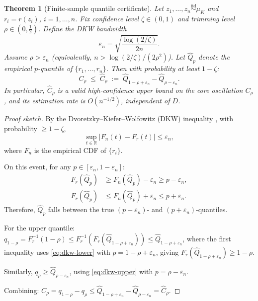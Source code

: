 \documentclass[11pt]{article}
\newtheorem{theorem}{Theorem}
\newcommand{\R}{\mathbb{R}}
\begin{document}
\begin{theorem}[Finite-sample quantile certificate]\label{thm:quantile}
Let $z_1, \dots, z_n \overset{\mathrm{iid}}{\sim} \mu_K$ and $r_i = r(z_i)$, $i=1,\dots,n$. Fix confidence level $\zeta \in (0,1)$ and trimming level $\rho \in (0, \tfrac{1}{2})$. Define the DKW bandwidth
\begin{equation}\label{eq:dkw-eps}
  \varepsilon_n = \sqrt{\frac{\log(2/\zeta)}{2n}}.
\end{equation}
Assume $\rho > \varepsilon_n$ (equivalently, $n > \log(2/\zeta)/(2\rho^2)$). Let $\hat{Q}_p$ denote the empirical $p$-quantile of $\{r_1,\dots,r_n\}$. Then with probability at least $1-\zeta$:
\begin{equation}\label{eq:cert-bound}
  C_\rho \;\le\; \hat{C}_\rho \;:=\; \hat{Q}_{1-\rho+\varepsilon_n} - \hat{Q}_{\rho-\varepsilon_n}.
\end{equation}
In particular, $\hat{C}_\rho$ is a valid high-confidence upper bound on the core oscillation $C_\rho$, and its estimation rate is $O(n^{-1/2})$, independent of $D$.
\end{theorem}

\begin{proof}[Proof sketch]
By the Dvoretzky--Kiefer--Wolfowitz (DKW) inequality \cite{DKW1956,Massart1990}, with probability $\ge 1-\zeta$,
\[
  \sup_{t \in \R} |F_n(t) - F_r(t)| \le \varepsilon_n,
\]
where $F_n$ is the empirical CDF of $\{r_i\}$.

On this event, for any $p \in [\varepsilon_n, 1-\varepsilon_n]$:
\begin{align}
  F_r(\hat{Q}_p) &\ge F_n(\hat{Q}_p) - \varepsilon_n \ge p - \varepsilon_n, \label{eq:dkw-lower}\\
  F_r(\hat{Q}_p) &\le F_n(\hat{Q}_p) + \varepsilon_n \le p + \varepsilon_n. \label{eq:dkw-upper}
\end{align}
Therefore, $\hat{Q}_p$ falls between the true $(p-\varepsilon_n)$- and $(p+\varepsilon_n)$-quantiles.

For the upper quantile: $q_{1-\rho} = F_r^{-1}(1-\rho) \le F_r^{-1}(F_r(\hat{Q}_{1-\rho+\varepsilon_n})) \le \hat{Q}_{1-\rho+\varepsilon_n}$, where the first inequality uses \eqref{eq:dkw-lower} with $p = 1-\rho+\varepsilon_n$, giving $F_r(\hat{Q}_{1-\rho+\varepsilon_n}) \ge 1-\rho$.

Similarly, $q_\rho \ge \hat{Q}_{\rho-\varepsilon_n}$, using \eqref{eq:dkw-upper} with $p = \rho-\varepsilon_n$.

Combining: $C_\rho = q_{1-\rho} - q_\rho \le \hat{Q}_{1-\rho+\varepsilon_n} - \hat{Q}_{\rho-\varepsilon_n} = \hat{C}_\rho$.
\end{proof}
\end{document}
